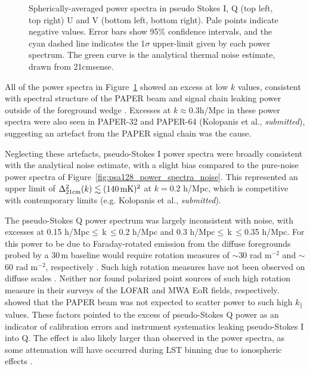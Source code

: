 \begin{figure}
\begin{tabular}{ll}
\end{tabular}
\caption[Spherically-averaged PAPER-128 power spectra.]{Spherically-averaged power spectra in pseudo Stokes I, Q (top left, top right) U and V (bottom left, bottom right). Pale points indicate negative values. Error bars show 95\% confidence intervals, and the cyan dashed line indicates the 1$\sigma$ upper-limit given by each power spectrum. The green curve is the analytical thermal noise estimate, drawn from {\sc 21cmsense}.}
\label{fig:psa128_power_spectra_data}
\end{figure}
 
All of the power spectra in Figure~\ref{fig:psa128_power_spectra_data} showed an excess at low $k$ values, consistent with spectral structure of the PAPER beam and signal chain leaking power outside of the foreground wedge \citep{Pober.13, Kerrigan.18}. Excesses at $k\approx0.3$h/Mpc in these power spectra were also seen in PAPER-32 \citep{Moore.17} and PAPER-64 (Kolopanis et al., \textit{submitted}), suggesting an artefact from the PAPER signal chain was the cause.

Neglecting these artefacts, pseudo-Stokes I power spectra were broadly consistent with the analytical noise estimate, with a slight bias compared to the pure-noise power spectra of Figure~\ref{fig:psa128_power_spectra_noise}. This represented an upper limit of $\Delta^2_{\rm 21cm}(k) \lesssim (140\, {\rm mK})^2$ at $k=0.2$ h/Mpc, which is competitive with contemporary limits (e.g. Kolopanis et al., \textit{submitted}).

The pseudo-Stokes Q power spectrum was largely inconsistent with noise, with excesses at 0.15 h/Mpc$\leqslant\,$k$\,\leqslant$0.2 h/Mpc and 0.3 h/Mpc$\leqslant\,$k$\,\leqslant$0.35 h/Mpc. For this power to be due to Faraday-rotated emission from the diffuse foregrounds probed by a 30\,m baseline would require rotation measures of $\sim$30 rad m$^{-2}$ and $\sim$60 rad m$^{-2}$, respectively \citep{Moore.13}. Such high rotation measures have not been observed on diffuse scales \citep[e.g.][]{Oppermann.12, Bernardi.13, Lenc.16}. Neither \cite{Asad.16} nor \cite{Lenc.16} found polarized point sources of such high rotation measure in their surveys of the LOFAR and MWA EoR fields, respectively. 
\cite{Kohn.16} showed that the PAPER beam was not expected to scatter power to such high $k_{\parallel}$ values.
These factors pointed to the excess of pseudo-Stokes Q power as an indicator of calibration errors and instrument systematics leaking pseudo-Stokes I into Q. The effect is also likely larger than observed in the power spectra, as some attenuation will have occurred during LST binning due to ionospheric effects \citep[][Martinot et al. (\textit{in prep.})]{Moore.17}.

